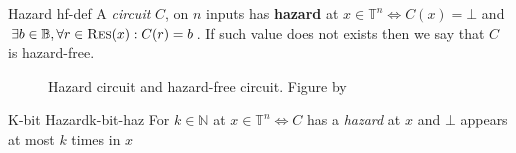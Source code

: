 \begin{definitionbox}{Hazard \cite{ikenmeyer_ComplexityHazardfreeCircuits_2019, eichelberger_HazardDetectionCombinational_1965}}{hf-def}
    A \textit{circuit} $C$, on $n$ inputs has \textbf{hazard} at $x \in \mathbb{T}^n \iff C(x) = \bot$
    and $\exists b \in \mathbb{B}, \forall r \in \textnormal{\textsc{Res}}(x): C(r) = b$. If such value does not exists
    then we say that $C$ is hazard-free.
\end{definitionbox}

\begin{figure}[h!]
    \centering
    \caption{Hazard circuit and hazard-free circuit. Figure by \cite{ikenmeyer_ComplexityHazardfreeCircuits_2019}}\label{fig:hazard-example}
\end{figure}

\begin{definitionbox}{K-bit Hazard}{k-bit-haz}
    For $k \in \mathbb{N}$ at $x \in \mathbb{T}^n \iff C$  has a \textit{hazard} at $x$ and $\bot$ appears at most $k$ times in $x$
\end{definitionbox}
%
%
%
